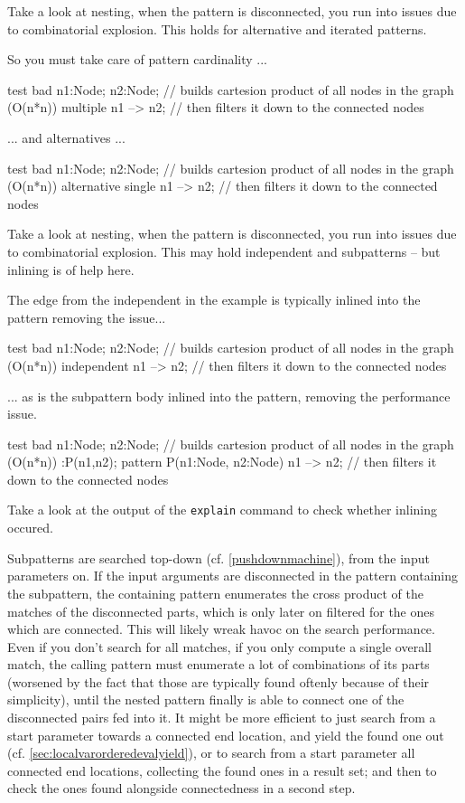 \begin{example}
Take a look at nesting, when the pattern is disconnected, you run into issues due to combinatorial explosion.
This holds for alternative and iterated patterns.

So you must take care of pattern cardinality ...
\begin{grgen}
test bad {
	n1:Node; n2:Node; // builds cartesion product of all nodes in the graph (O(n*n))
  multiple {
		n1 --> n2; // then filters it down to the connected nodes
  }
}
\end{grgen}
... and alternatives ...
\begin{grgen}
test bad {
	n1:Node; n2:Node; // builds cartesion product of all nodes in the graph (O(n*n))
  alternative {
		single {
			n1 --> n2; // then filters it down to the connected nodes
		}
  }
}
\end{grgen}
\end{example}

\begin{example}
Take a look at nesting, when the pattern is disconnected, you run into issues due to combinatorial explosion.
This may hold independent and subpatterns -- but inlining is of help here.

The edge from the independent in the example is typically inlined into the pattern removing the issue...
\begin{grgen}
test bad {
	n1:Node; n2:Node; // builds cartesion product of all nodes in the graph (O(n*n))
  independent {
		n1 --> n2; // then filters it down to the connected nodes
  }
}
\end{grgen}
... as is the subpattern body inlined into the pattern, removing the performance issue.
\begin{grgen}
test bad {
	n1:Node; n2:Node; // builds cartesion product of all nodes in the graph (O(n*n))
  :P(n1,n2);
}
pattern P(n1:Node, n2:Node) {
	n1 --> n2; // then filters it down to the connected nodes
}
\end{grgen}
Take a look at the output of the \texttt{explain} command to check whether inlining occured.
\end{example}

Subpatterns are searched top-down (cf. \ref{pushdownmachine}), from the input parameters on.
If the input arguments are disconnected in the pattern containing the subpattern, the containing pattern enumerates the cross product of the matches of the disconnected parts, which is only later on filtered for the ones which are connected.
This will likely wreak havoc on the search performance.
Even if you don't search for all matches, if you only compute a single overall match, the calling pattern must enumerate a lot of combinations of its parts (worsened by the fact that those are typically found oftenly because of their simplicity), until the nested pattern finally is able to connect one of the disconnected pairs fed into it.
It might be more efficient to just search from a start parameter towards a connected end location, and yield the found one out (cf. \ref{sec:localvarorderedevalyield}), or to search from a start parameter all connected end locations, collecting the found ones in a result set; and then to check the ones found alongside connectedness in a second step.

